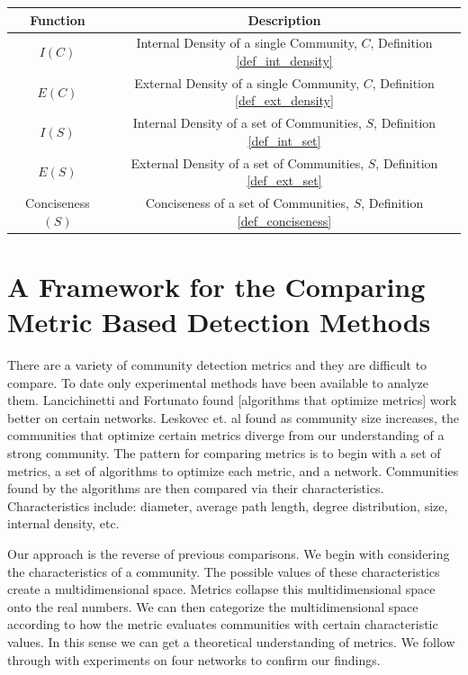 \documentclass[phd,tocprelim]{cornell}
\renewcommand{\caption}[1]{\singlespacing\hangcaption{#1}\normalspacing}
\begin{document}
\begin{table}
\caption{Introduced Functions}
\begin{center}
\begin{tabular}{|c|c|} \hline
Function & Description \\ \hline
$I(C)$ & Internal Density of a single Community, $C$, Definition \ref{def_int_density} \\ \hline
$E(C)$ & External Density of a single Community, $C$, Definition  \ref{def_ext_density} \\ \hline
$I(S)$ & Internal Density of a set of Communities, $S$, Definition \ref{def_int_set} \\ \hline
$E(S)$ & External Density of a set of Communities, $S$, Definition \ref{def_ext_set} \\ \hline
{\sc Conciseness}$(S)$ & Conciseness of a set of Communities, $S$, Definition \ref{def_conciseness} \\ \hline
\end{tabular}
\end{center}
\label{table_new_functions}
\end{table}





\chapter{A Framework for the Comparing Metric Based Detection Methods}

There are a variety of community detection metrics and they are difficult to compare.  To date only experimental methods have been available to analyze them.  Lancichinetti and Fortunato \cite{lanc:2009} found [algorithms that optimize metrics] work better on certain networks.  Leskovec et. al \cite{leskovec} found as community size increases, the communities that optimize certain metrics diverge from our understanding of a strong community.  The pattern for comparing metrics is to begin with a set of metrics, a set of algorithms to optimize each metric, and a network.  Communities found by the algorithms are then compared via their characteristics.  Characteristics include: diameter, average path length, degree distribution, size, internal density, etc.

Our approach is the reverse of previous comparisons.  We begin with considering the characteristics of a community.  The possible values of these characteristics create a multidimensional space.  Metrics collapse this multidimensional space onto the real numbers.  We can then categorize the multidimensional space according to how the metric evaluates communities with certain characteristic values.  In this sense we can get a theoretical understanding of metrics.  We follow through with experiments on four networks to confirm our findings.
\end{document}
